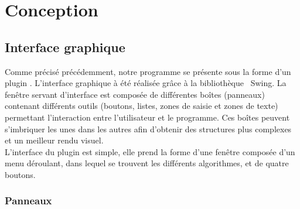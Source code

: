 
\newcommand{\black}{\color{black}}
\newcommand{\blue}{\color{blue}}

\chapter{Conception}

\section{Interface graphique}

Comme précisé précédemment, notre programme se présente sous la forme d'un plugin \imj . L'interface graphique à été réalisée grâce à la bibliothèque  \java ~Swing. %
La fenêtre servant d'interface est composée de différentes boîtes (panneaux) contenant différents outils (boutons, listes, zones de saisie et zones de texte) permettant l'interaction entre l'utilisateur et le programme. Ces boîtes peuvent s'imbriquer les unes dans les autres afin d'obtenir des structures plus complexes et un meilleur rendu visuel. \\
L'interface du plugin est simple, elle prend la forme d'une fenêtre composée d'un menu déroulant, dans lequel se trouvent les différents algorithmes, et de quatre boutons. 

\subsection{Panneaux}


